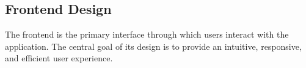 \subsection{Frontend Design}

The frontend is the primary interface through which users interact with the application. The central goal of its design is to provide an intuitive, responsive, and efficient user experience. 


